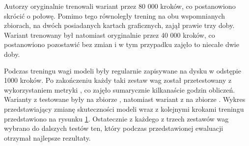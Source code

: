 Autorzy  oryginalnie trenowali wariant  przez 80 000 kroków, co postanowiono skrócić o połowę. Pomimo tego równoległy trening na obu wspomnianych zbiorach, na dwóch posiadanych kartach graficznych, zajął prawie trzy doby. Wariant  trenowany był natomiast oryginalnie przez 40 000 kroków, co postanowiono pozostawić bez zmian i w tym przypadku zajęło to niecałe dwie doby. 

\begin{figure}[ht]
  \begin{center}
    \label{plot:ratsql-accuracy}
  \end{center}
\end{figure}

Podczas treningu wagi modeli były regularnie zapisywane na dysku w odstępie 1000 kroków. Po zakończeniu każdy taki zestaw wag został przetestowany z wykorzystaniem metryki , co zajęło sumarycznie kilkanaście godzin obliczeń. Warianty z  testowane były na zbiorze , natomiast wariant z  na zbiorze . Wykres przedstawiający zmianę skuteczności modeli wraz z kolejnymi krokami treningu przedstawiono na rysunku \ref{plot:ratsql-accuracy}. Ostatecznie z każdego z trzech zestawów wag wybrano do dalszych testów ten, który podczas przedstawionej ewaluacji otrzymał najlepsze rezultaty. 

